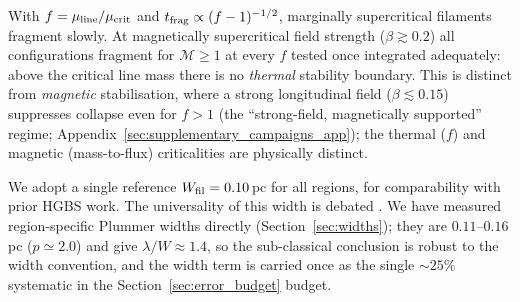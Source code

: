 \documentclass[usenatbib,twoside,twocolumn]{mnras}
\begin{document}
With $f=\mu_{\rm line}/\mu_{\rm crit}$ and $t_{\rm frag}\propto(f-1)^{-1/2}$, marginally supercritical filaments fragment slowly. At magnetically supercritical field strength ($\beta\gtrsim0.2$) all configurations fragment for $\mathcal{M}\geq1$ at every $f$ tested once integrated adequately: above the critical line mass there is no \emph{thermal} stability boundary. This is distinct from \emph{magnetic} stabilisation, where a strong longitudinal field ($\beta\lesssim0.15$) suppresses collapse even for $f>1$ (the ``strong-field, magnetically supported'' regime; Appendix~\ref{sec:supplementary_campaigns_app}); the thermal ($f$) and magnetic (mass-to-flux) criticalities are physically distinct.

We adopt a single reference $W_{\rm fil}=0.10$\,pc for all regions, for comparability with prior HGBS work. The universality of this width is debated \citep{Panopoulou2017,Panopoulou2022}. We have measured region-specific Plummer widths directly (Section~\ref{sec:widths}); they are $0.11$--$0.16$\,pc ($p\simeq2.0$) and give $\lambda/W\approx1.4$, so the sub-classical conclusion is robust to the width convention, and the width term is carried once as the single $\sim25\%$ systematic in the Section~\ref{sec:error_budget} budget.
\end{document}
